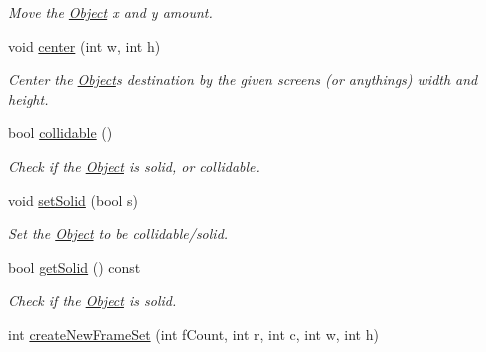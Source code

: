 \begin{DoxyCompactItemize}
\begin{DoxyCompactList}\small\item\em Move the \hyperlink{classObject}{Object} x and y amount. \end{DoxyCompactList}\item 
void \hyperlink{classObject_a95af63b61c22ac2a8117742b9fa0efb5}{center} (int w, int h)\hypertarget{classObject_a95af63b61c22ac2a8117742b9fa0efb5}{}\label{classObject_a95af63b61c22ac2a8117742b9fa0efb5}

\begin{DoxyCompactList}\small\item\em Center the \hyperlink{classObject}{Object}\textquotesingle{}s destination by the given screens (or anythings) width and height. \end{DoxyCompactList}\item 
bool \hyperlink{classObject_a2a09d094befe949a0b879a62244de46e}{collidable} ()\hypertarget{classObject_a2a09d094befe949a0b879a62244de46e}{}\label{classObject_a2a09d094befe949a0b879a62244de46e}

\begin{DoxyCompactList}\small\item\em Check if the \hyperlink{classObject}{Object} is solid, or collidable. \end{DoxyCompactList}\item 
void \hyperlink{classObject_a470cdfc175b5fb0bd324a585ee5fce3f}{set\+Solid} (bool s)\hypertarget{classObject_a470cdfc175b5fb0bd324a585ee5fce3f}{}\label{classObject_a470cdfc175b5fb0bd324a585ee5fce3f}

\begin{DoxyCompactList}\small\item\em Set the \hyperlink{classObject}{Object} to be collidable/solid. \end{DoxyCompactList}\item 
bool \hyperlink{classObject_a5efbee91dd5bf04c6fb4bffef99ceba8}{get\+Solid} () const \hypertarget{classObject_a5efbee91dd5bf04c6fb4bffef99ceba8}{}\label{classObject_a5efbee91dd5bf04c6fb4bffef99ceba8}

\begin{DoxyCompactList}\small\item\em Check if the \hyperlink{classObject}{Object} is solid. \end{DoxyCompactList}\item 
int \hyperlink{classObject_a21238c368f570c14722cb00b74353732}{create\+New\+Frame\+Set} (int f\+Count, int r, int c, int w, int h)\hypertarget{classObject_a21238c368f570c14722cb00b74353732}{}\label{classObject_a21238c368f570c14722cb00b74353732}


\end{DoxyCompactItemize}
